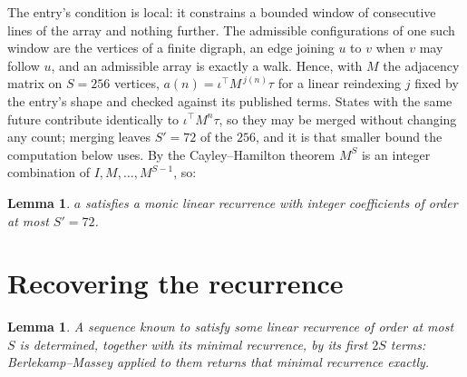 \documentclass[11pt,a4paper]{article}
\theoremstyle{plain}
\newtheorem{lemma}[theorem]{Lemma}
\theoremstyle{definition}
\begin{document}
The entry's condition is local: it constrains a bounded window of consecutive lines of the
array and nothing further. The admissible configurations of one such window are the vertices
of a finite digraph, an edge joining $u$ to $v$ when $v$ may follow $u$, and an admissible
array is exactly a walk. Hence, with $M$ the adjacency matrix on $S=256$ vertices,
$a(n)=\iota^{\!\top}M^{\,j(n)}\tau$ for a linear reindexing $j$ fixed by the entry's shape
and checked against its published terms. States with the same future contribute identically to $\iota^{\!\top}M^n\tau$, so they may be merged without changing any count; merging leaves $S'=72$ of the $256$, and it is that smaller bound the computation below uses. By the Cayley--Hamilton theorem $M^{S}$ is an
integer combination of $I,M,\dots,M^{S-1}$, so:

\begin{lemma}\label{lem:cf}
$a$ satisfies a monic linear recurrence with integer coefficients of order at most
$S'=72$.
\end{lemma}

\section{Recovering the recurrence}

\begin{lemma}\label{lem:bm}
A sequence known to satisfy some linear recurrence of order at most $S$ is determined, together
with its minimal recurrence, by its first $2S$ terms: Berlekamp--Massey applied to them returns
that minimal recurrence exactly.
\end{lemma}
\end{document}

